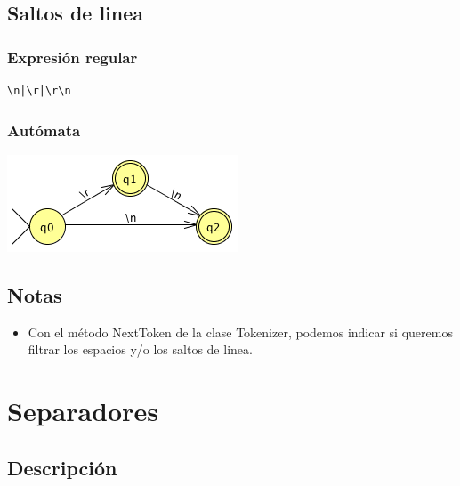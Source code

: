         \subsection{Saltos de linea}
        
            \subsubsection{Expresión regular}
            
                \begin{lstlisting}[language=Perl]
\n|\r|\r\n
                \end{lstlisting}
                
            \subsubsection{Autómata}
         
                \includegraphics[scale=.7]{../Design/jflap/Salto_de_linea.png}
            
        \subsection{Notas}
        
            \begin{itemize}
            
                \item Con el método NextToken de la clase Tokenizer, podemos indicar si queremos filtrar los espacios y/o los saltos de linea.
            
            \end{itemize}
            
            \hfill
            \clearpage
            
            
            
    \section{Separadores}
    
        \subsection{Descripción}
        
